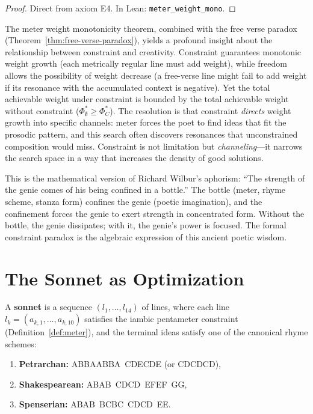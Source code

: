 \begin{proof}
Direct from axiom E4.  In Lean: \texttt{meter\_weight\_mono}.
\end{proof}

\begin{remark}
\label{rem:formal-constraint-paradox}
The meter weight monotonicity theorem, combined with the free verse paradox (Theorem~\ref{thm:free-verse-paradox}), yields a profound insight about the relationship between constraint and creativity.  Constraint guarantees monotonic weight growth (each metrically regular line must add weight), while freedom allows the possibility of weight decrease (a free-verse line might fail to add weight if its resonance with the accumulated context is negative).  Yet the total achievable weight under constraint is bounded by the total achievable weight without constraint ($\Phi^\ast_\emptyset \geq \Phi^\ast_C$).  The resolution is that constraint \emph{directs} weight growth into specific channels: meter forces the poet to find ideas that fit the prosodic pattern, and this search often discovers resonances that unconstrained composition would miss.  Constraint is not limitation but \emph{channeling}---it narrows the search space in a way that increases the density of good solutions.

This is the mathematical version of Richard Wilbur's aphorism: ``The strength of the genie comes of his being confined in a bottle.''  The bottle (meter, rhyme scheme, stanza form) confines the genie (poetic imagination), and the confinement forces the genie to exert strength in concentrated form.  Without the bottle, the genie dissipates; with it, the genie's power is focused.  The formal constraint paradox is the algebraic expression of this ancient poetic wisdom.
\end{remark}


\section{The Sonnet as Optimization}

\begin{definition}
\label{def:sonnet}
A \textbf{sonnet} is a sequence $(l_1, \ldots, l_{14})$ of lines, where each
line $l_k = (a_{k,1}, \ldots, a_{k,10})$ satisfies the iambic pentameter
constraint (Definition~\ref{def:meter}), and the terminal ideas satisfy
one of the canonical rhyme schemes:
\begin{enumerate}
  \item \textbf{Petrarchan:} ABBAABBA~CDECDE (or CDCDCD),
  \item \textbf{Shakespearean:} ABAB~CDCD~EFEF~GG,
  \item \textbf{Spenserian:} ABAB~BCBC~CDCD~EE.
\end{enumerate}
\end{definition}

